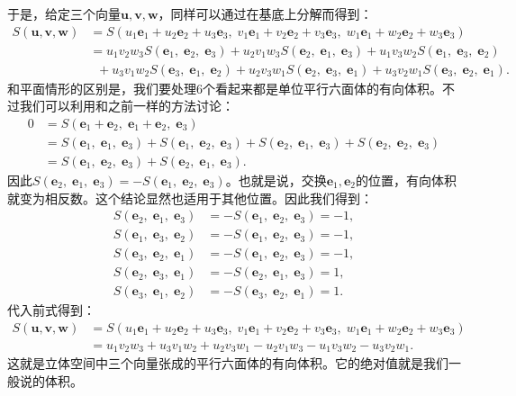 \documentclass[12pt,UTF8,fontset=none]{ctexbook}
\begin{document}
于是，给定三个向量$\mathbf{u}, \mathbf{v},\mathbf{w}$，同样可以通过在基底上分解而得到：
\begin{align*}
    S(\mathbf{u}, \mathbf{v},\mathbf{w}) &= S(u_1\mathbf{e}_1 + u_2\mathbf{e}_2+u_3\mathbf{e}_3, \; v_1\mathbf{e}_1 + v_2 \mathbf{e}_2+v_3\mathbf{e}_3, \;w_1\mathbf{e}_1 + w_2\mathbf{e}_2 + w_3\mathbf{e}_3) \\
    &= u_1v_2w_3 S(\mathbf{e}_1, \;\mathbf{e}_2, \;\mathbf{e}_3) + u_2v_1w_3 S(\mathbf{e}_2, \;\mathbf{e}_1,\;\mathbf{e}_3)+ u_1v_3w_2 S(\mathbf{e}_1, \;\mathbf{e}_3, \;\mathbf{e}_2) \\
    &\;\; + u_3v_1w_2 S(\mathbf{e}_3, \;\mathbf{e}_1,\;\mathbf{e}_2) + u_2v_3w_1 S(\mathbf{e}_2, \;\mathbf{e}_3, \;\mathbf{e}_1) + u_3v_2w_1 S(\mathbf{e}_3, \;\mathbf{e}_2,\;\mathbf{e}_1) .
\end{align*}
和平面情形的区别是，我们要处理$6$个看起来都是单位平行六面体的有向体积。不过我们可以利用和之前一样的方法讨论：
\begin{align*}
    0 &= S(\mathbf{e}_1 + \mathbf{e}_2, \;\mathbf{e}_1 + \mathbf{e}_2,\; \mathbf{e}_3) \\
    &= S(\mathbf{e}_1, \;\mathbf{e}_1,\; \mathbf{e}_3) + S(\mathbf{e}_1, \;\mathbf{e}_2,\; \mathbf{e}_3) + S(\mathbf{e}_2, \;\mathbf{e}_1,\; \mathbf{e}_3) + S(\mathbf{e}_2, \;\mathbf{e}_2,\; \mathbf{e}_3) \\
    &= S(\mathbf{e}_1, \;\mathbf{e}_2,\; \mathbf{e}_3) + S(\mathbf{e}_2, \;\mathbf{e}_1,\; \mathbf{e}_3).
\end{align*}
因此$S(\mathbf{e}_2, \;\mathbf{e}_1,\; \mathbf{e}_3) = -S(\mathbf{e}_1, \;\mathbf{e}_2,\; \mathbf{e}_3)$。也就是说，交换$\mathbf{e}_1,\mathbf{e}_2$的位置，有向体积就变为相反数。这个结论显然也适用于其他位置。因此我们得到：
\begin{align*}
    S(\mathbf{e}_2, \;\mathbf{e}_1,\; \mathbf{e}_3) &= -S(\mathbf{e}_1, \;\mathbf{e}_2,\; \mathbf{e}_3) = -1,\\
    S(\mathbf{e}_1, \;\mathbf{e}_3,\; \mathbf{e}_2) &= -S(\mathbf{e}_1, \;\mathbf{e}_2,\; \mathbf{e}_3) = -1,\\
    S(\mathbf{e}_3, \;\mathbf{e}_2,\; \mathbf{e}_1) &= -S(\mathbf{e}_1, \;\mathbf{e}_2,\; \mathbf{e}_3) = -1, \\
    S(\mathbf{e}_2, \;\mathbf{e}_3,\; \mathbf{e}_1) &= -S(\mathbf{e}_2, \;\mathbf{e}_1,\; \mathbf{e}_3) = 1,\\
    S(\mathbf{e}_3, \;\mathbf{e}_1,\; \mathbf{e}_2) &= -S(\mathbf{e}_3, \;\mathbf{e}_2,\; \mathbf{e}_1) = 1.
\end{align*}
代入前式得到：
\begin{align*}
    S(\mathbf{u}, \mathbf{v},\mathbf{w}) &= S(u_1\mathbf{e}_1 + u_2\mathbf{e}_2+u_3\mathbf{e}_3, \; v_1\mathbf{e}_1 + v_2 \mathbf{e}_2+v_3\mathbf{e}_3, \;w_1\mathbf{e}_1 + w_2\mathbf{e}_2 + w_3\mathbf{e}_3) \\
    &= u_1v_2w_3 + u_3v_1w_2 + u_2v_3w_1 - u_2v_1w_3 - u_1v_3w_2 - u_3v_2w_1  .
\end{align*}
这就是立体空间中三个向量张成的平行六面体的有向体积。它的绝对值就是我们一般说的体积。
\end{document}
